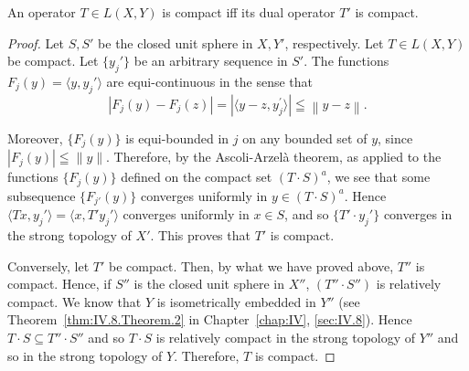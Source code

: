 \begin{theoremn}[Schauder] An operator $T \in L(X, Y)$ is compact iff its dual operator $T'$ is compact.

\end{theoremn}
\begin{proof}
 Let $S, S'$ be the closed unit sphere in $X, Y'$, respectively. Let $T \in L(X, Y)$ be compact. Let $\{y_j'\}$ be an arbitrary sequence in $S'$. The functions $F_j(y) = \langle y, y_j' \rangle$ are equi-continuous in the sense that 
\[
\left| F _{j} (y) - F _{j} (z) \right| = \left| \langle y - z, y _{j} ^{\prime} \rangle \right| \leqq \left\| y - z \right\|. \]

Moreover, $\{F_j(y)\}$ is equi-bounded in $j$ on any bounded set of $y$, since $|F_j(y)| \leqq \|y\|$. Therefore, by the Ascoli-Arzelà theorem, as applied to the functions $\{F_j(y)\}$ defined on the compact set $(T\cdot S)^a$, we see that some subsequence $\{F_{j'}(y)\}$ converges uniformly in $y\in (T\cdot S)^a$. Hence $\langle Tx,y_j'\rangle = \langle x,T'y_j'\rangle$ converges uniformly in $x\in S$, and so $\{T'\cdot y_j'\}$ converges in the strong topology of $X'$. This proves that $T'$ is compact. 

Conversely, let $T'$ be compact. Then, by what we have proved above, $T''$ is compact. Hence, if $S''$ is the closed unit sphere in $X''$, $(T'' \cdot S'')$ is relatively compact. We know that $Y$ is isometrically embedded in $Y''$ (see Theorem~\ref{thm:IV.8.Theorem.2} in Chapter~\ref{chap:IV}, \ref{sec:IV.8}). Hence $T \cdot S \subseteq T'' \cdot S''$ and so $T \cdot S$ is relatively compact in the strong topology of $Y''$ and so in the strong topology of $Y$. Therefore, $T$ is compact. 
\end{proof}


\label{sec:X.5}

